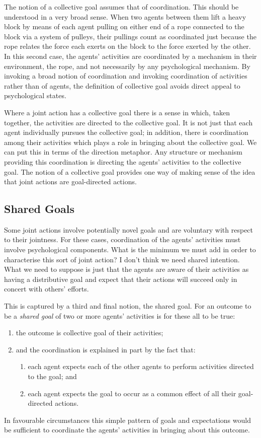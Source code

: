 \documentclass[14pt,a4paper]{extarticle}
\begin{document}
The notion of a collective goal assumes that of coordination.  This should be understood in a very broad sense.  
When two agents between them lift a heavy block by means of each agent pulling on either end of a rope connected to the block via a system of pulleys, their pullings count as coordinated just because the rope relates the force each exerts on the block to the force exerted by the other.  
In this second case, the agents' activities are coordinated by a mechanism in their environment, the rope, and not necessarily by any psychological mechanism.  
By invoking a broad notion of coordination 
and invoking coordination of activities rather than of agents,
the definition of collective goal avoids direct appeal to psychological states.

Where a joint action has a collective goal there is a sense in which, taken together, the activities are directed to the collective goal.  It is not just that each agent individually pursues the collective goal; in addition, there is coordination among their activities which plays a role in bringing about the collective goal.  We can put this in terms of the direction metaphor.  Any structure or mechanism providing this coordination is directing the agents' activities to the collective goal.  The notion of a collective goal provides one way of making sense of the idea that joint actions are goal-directed actions.

\subsection{Shared Goals}

Some joint actions involve potentially novel goals and are voluntary with respect to their jointness.
For these cases, coordination of the agents' activities must involve psychological components.
What is the minimum we must add in order to characterise this sort of joint action?
I don't think we need shared intention.
What we need to suppose is just that the agents are aware of their activities as having a distributive goal and expect that their actions will succeed only in concert with others' efforts.

This is captured by a third and final notion, the shared goal.
For an outcome to be a \emph{shared goal} of two or more agents' activities is for these all to be true:
\begin{enumerate}
\item the outcome is collective goal of their activities;
\item and the coordination is explained in part by the fact that:
\begin{enumerate}
\item each agent expects each of the other agents to perform activities directed to the goal; and
\item each agent expects the goal to occur as a common effect of all their goal-directed actions.
\end{enumerate}
\end{enumerate}
%
In favourable circumstances this simple pattern of goals and expectations would be sufficient to coordinate the agents’ activities in bringing about this outcome. 
\end{document}
